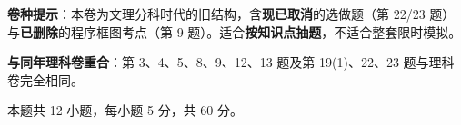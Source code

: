 

\begin{gknotice}
\textbf{ 卷种提示}：本卷为文理分科时代的旧结构，含\textbf{现已取消}的选做题（第 22/23 题）与\textbf{已删除}的程序框图考点（第 9 题）。适合\textbf{按知识点抽题}，不适合整套限时模拟。

\textbf{与同年理科卷重合}：第 3、4、5、8、9、12、13 题及第 19(1)、22、23 题与理科卷完全相同。
\end{gknotice}

\par\medskip


\begin{gktip}
本题共 12 小题，每小题 5 分，共 60 分。
\end{gktip}

